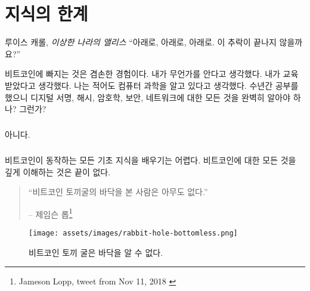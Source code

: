 \chapter{지식의 한계}
\label{les:7}

\begin{chapquote}{루이스 캐롤, \textit{이상한 나라의 앨리스}}
\enquote{아래로, 아래로, 아래로. 이 추락이 끝나지 않을까요?}
\end{chapquote}

비트코인에 빠지는 것은 겸손한 경험이다. 
내가 무언가를 안다고 생각했다. 
내가 교육받았다고 생각했다. 
나는 적어도 컴퓨터 과학을 알고 있다고 생각했다. 
수년간 공부를 했으니 디지털 서명,
해시, 암호학, 보안, 네트워크에 대한 모든 것을 완벽히 알아야 하나? 그런가?

\paragraph{}
아니다.

\paragraph{}
비트코인이 동작하는 모든 기초 지식을 배우기는 어렵다. 
비트코인에 대한 모든 것을 깊게 이해하는 것은 끝이 없다.

\begin{quotation}\begin{samepage}
\enquote{비트코인 토끼굴의 바닥을 본 사람은 아무도 없다.}
\begin{flushright} -- 제임슨 롭\footnote{Jameson Lopp, tweet from Nov 11, 2018 \cite{lopp-tweet}}
\end{flushright}\end{samepage}\end{quotation}

\begin{figure}
  \centering
  \texttt{[image: assets/images/rabbit-hole-bottomless.png]}
  \caption{비트코인 토끼 굴은 바닥을 알 수 없다.}
  \label{fig:rabbit-hole-bottomless}
\end{figure}

